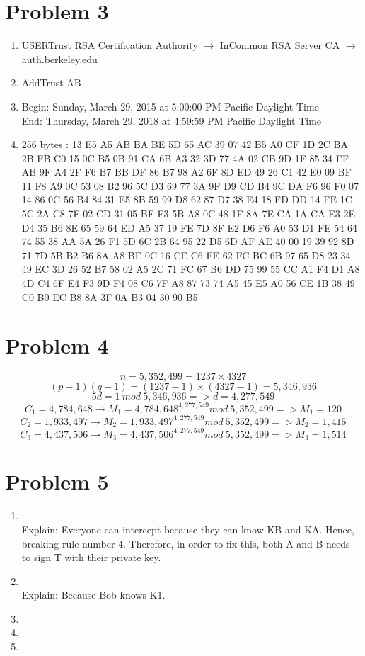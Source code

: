 \documentclass[11pt]{article}
\newenvironment{qparts}{\begin{enumerate}[{(}a{)}]}{\end{enumerate}}
\begin{document}
\section*{Problem 3}

\begin{qparts}
\item
USERTrust RSA Certification Authority $\rightarrow$ InCommon RSA Server CA $\rightarrow$ auth.berkeley.edu
\item
AddTrust AB

\item
Begin: Sunday, March 29, 2015 at 5:00:00 PM Pacific Daylight Time\\
End: Thursday, March 29, 2018 at 4:59:59 PM Pacific Daylight Time
\item

256 bytes : 13 E5 A5 AB BA BE 5D 65 AC 39 07 42 B5 A0 CF 1D 2C BA 2B FB C0 15 0C B5 0B 91 CA 6B A3 32 3D 77 4A 02 CB 9D 1F 85 34 FF AB 9F A4 2F F6 B7 BB DF 86 B7 98 A2 6F 8D ED 49 26 C1 42 E0 09 BF 11 F8 A9 0C 53 08 B2 96 5C D3 69 77 3A 9F D9 CD B4 9C DA F6 96 F0 07 14 86 0C 56 B4 84 31 E5 8B 59 99 D8 62 87 D7 38 E4 18 FD DD 14 FE 1C 5C 2A C8 7F 02 CD 31 05 BF F3 5B A8 0C 48 1F 8A 7E CA 1A CA E3 2E D4 35 B6 8E 65 59 64 ED A5 37 19 FE 7D 8F E2 D6 F6 A0 53 D1 FE 54 64 74 55 38 AA 5A 26 F1 5D 6C 2B 64 95 22 D5 6D AF AE 40 00 19 39 92 8D 71 7D 5B B2 B6 8A A8 BE 0C 16 CE C6 FE 62 FC BC 6B 97 65 D8 23 34 49 EC 3D 26 52 B7 58 02 A5 2C 71 FC 67 B6 DD 75 99 55 CC A1 F4 D1 A8 4D C4 6F E4 F3 9D F4 08 C6 7F A8 87 73 74 A5 45 E5 A0 56 CE 1B 38 49 C0 B0 EC B8 8A 3F 0A B3 04 30 90 B5

\end{qparts}


\newpage
\section*{Problem 4}
$$n = 5,352,499 = 1237 \times 4327$$
$$(p-1)(q-1) = (1237-1) \times (4327-1) = 5,346,936$$
$$5d = 1\ mod\ 5,346,936 => d = 4,277,549$$
$$C_1 = 4,784,648 \rightarrow M_1 = 4,784,648^{4,277,549} mod\ 5,352,499 => \boxed{M_1 =  120}$$
$$C_2 = 1,933,497 \rightarrow M_2 = 1,933,497^{4,277,549} mod\ 5,352,499 => \boxed{M_2 =  1,415}$$
$$C_3 = 4,437,506 \rightarrow M_3 = 4,437,506^{4,277,549} mod\ 5,352,499 => \boxed{M_3 =  1,514}$$
\newpage
\section*{Problem 5}
\begin{qparts}

\item
{}\\
Explain: Everyone can intercept because they can know KB and KA. Hence, breaking rule number 4. Therefore, in order to fix this, both A and B needs to sign T with their private key.
\item
{}\\
Explain: Because Bob knows K1.
\item
{}
\item
{}
\item
{}

\end{qparts}
\end{document}
